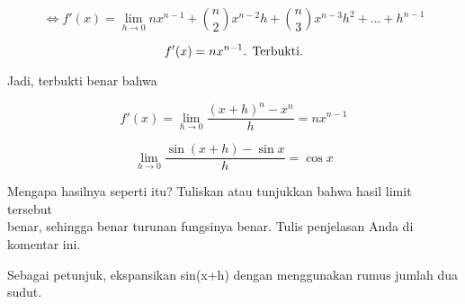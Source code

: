 \documentclass{article}
\begin{document}
\begin{eulernotebook}
\begin{eulercomment}
\begin{eulercomment}
\begin{eulerformula}
\[
\text{$\Leftrightarrow f'(x)=\lim_{h\to 0} nx^{n-1}+\binom{n}{2}x^{n-2}h+\binom{n}{3}x^{n-3}h^2+ ...+h^{n-1}$}
\]
\end{eulerformula}
\begin{eulercomment}
\end{eulercomment}
\begin{eulerformula}
\[
\text{$ f'(x)=nx^{n-1}$. Terbukti.}
\]
\end{eulerformula}
\begin{eulercomment}
Jadi, terbukti benar bahwa\\
\end{eulercomment}
\begin{eulerformula}
\[
\text{$f'(x)=\lim_{h\to 0} \frac{(x+h)^n-x^n}{h}=nx^{n-1}$}
\]
\end{eulerformula}
\eulersubheading{}
\begin{eulerformula}
\[
\lim_{h\rightarrow 0}{\frac{\sin \left(x+h\right)-\sin x}{h}}=\cos   x
\]
\end{eulerformula}
\begin{eulercomment}
Mengapa hasilnya seperti itu? Tuliskan atau tunjukkan bahwa hasil
limit tersebut\\
benar, sehingga benar turunan fungsinya benar.  Tulis penjelasan Anda
di komentar ini.

Sebagai petunjuk, ekspansikan sin(x+h) dengan menggunakan rumus jumlah
dua sudut.


\end{eulercomment}
\end{eulercomment}
\end{eulercomment}
\end{eulernotebook}
\end{document}
